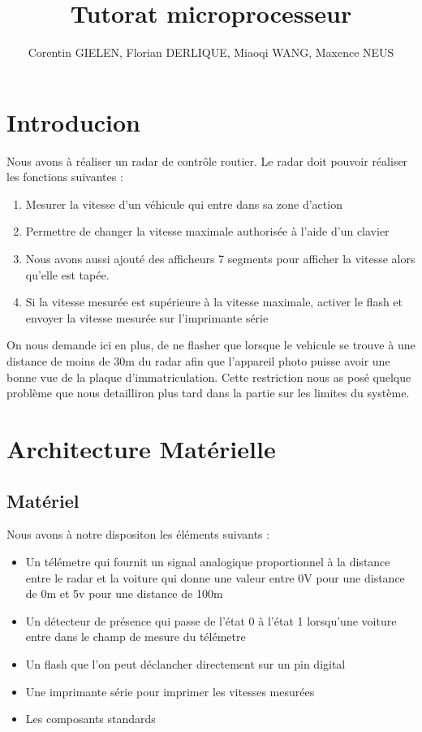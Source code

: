 \documentclass[a4paper, 12pt]{article}
\begin{document}
	\title{Tutorat microprocesseur}
	\author{Corentin GIELEN, Florian DERLIQUE, Miaoqi WANG, Maxence NEUS}
	\maketitle
	
	\newpage
	\tableofcontents
	\newpage
	
	\section{Introducion}
		Nous avons à réaliser un radar de contrôle routier.
		Le radar doit pouvoir réaliser les fonctions suivantes :
		\begin{enumerate}
			\item Mesurer la vitesse d'un véhicule qui entre dans sa zone d'action
			\item Permettre de changer la vitesse maximale authorisée à l'aide d'un clavier
			\item Nous avons aussi ajouté des afficheurs 7 segments pour afficher la vitesse alors qu'elle est tapée.
			\item Si la vitesse mesurée est supérieure à la vitesse maximale, activer le flash et envoyer la vitesse mesurée sur l'imprimante série
		\end{enumerate}
	
		On nous demande ici en plus, de ne flasher que lorsque le vehicule se trouve à une distance de moins de 30m du radar afin que l'appareil photo puisse avoir une bonne vue de la plaque d'immatriculation. Cette restriction nous as posé quelque problème que nous detailliron plus tard dans la partie sur les limites du système.
		
		
	\newpage
	\section{Architecture Matérielle}
		\subsection{Matériel}
		Nous avons à notre dispositon les éléments suivants :
		\begin{itemize}
			\item Un télémetre qui fournit un signal analogique proportionnel à la distance entre le radar et la voiture
			qui donne une valeur entre 0V pour une distance de 0m et 5v pour une distance de 100m
			\item Un détecteur de présence qui passe de l'état 0 à l'état 1 lorsqu'une voiture entre dans le champ de mesure du télémetre
			\item Un flash que l'on peut déclancher directement sur un pin digital
			\item Une imprimante série pour imprimer les vitesses mesurées
			\item Les composants standards
		\end{itemize}	
\end{document}

